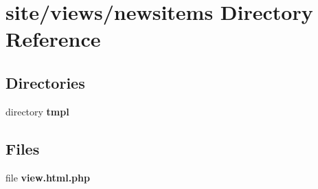 \section{site/views/newsitems Directory Reference}
\label{dir_bd59137d45323de55826cceae46becbf}
\subsection*{Directories}
\begin{DoxyCompactItemize}
\item 
directory \textbf{ tmpl}
\end{DoxyCompactItemize}
\subsection*{Files}
\begin{DoxyCompactItemize}
\item 
file \textbf{ view.\+html.\+php}
\end{DoxyCompactItemize}
